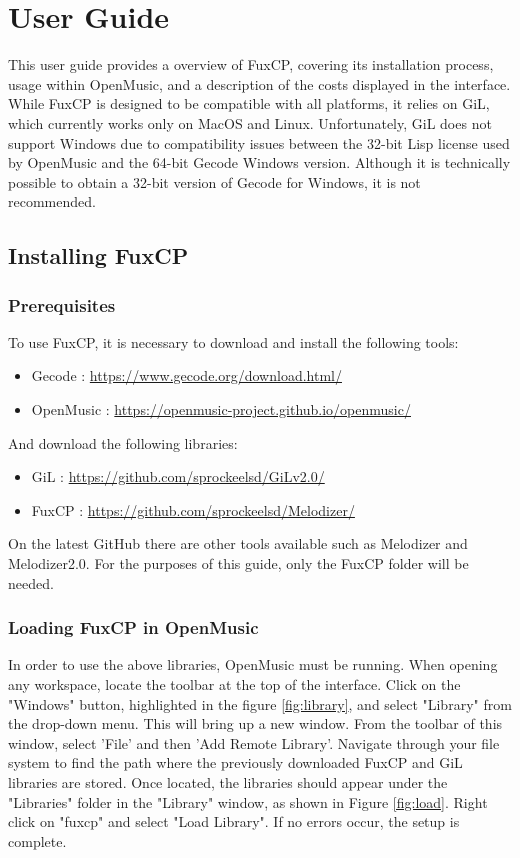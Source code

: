 \chapter{User Guide}
This user guide provides a overview of FuxCP, covering its installation process, usage within OpenMusic, and a description of the costs displayed in the interface. While FuxCP is designed to be compatible with all platforms, it relies on GiL, which currently works only on MacOS and Linux. Unfortunately, GiL does not support Windows due to compatibility issues between the 32-bit Lisp license used by OpenMusic and the 64-bit Gecode Windows version. Although it is technically possible to obtain a 32-bit version of Gecode for Windows, it is not recommended. 

\section{Installing FuxCP}
\subsection{Prerequisites}
To use FuxCP, it is necessary to download and install the following tools:
\begin{itemize}
    \item Gecode : \url{https://www.gecode.org/download.html/}
    \item OpenMusic : \url{https://openmusic-project.github.io/openmusic/}
\end{itemize}

And download the following libraries:
\begin{itemize}
    \item GiL : \url{https://github.com/sprockeelsd/GiLv2.0/}
    \item FuxCP : \url{https://github.com/sprockeelsd/Melodizer/}
\end{itemize}
On the latest GitHub there are other tools available such as Melodizer and Melodizer2.0. For the purposes of this guide, only the FuxCP folder will be needed.

\subsection{Loading FuxCP in OpenMusic}
In order to use the above libraries, OpenMusic must be running. When opening any workspace, locate the toolbar at the top of the interface. Click on the "Windows" button, highlighted in the figure \ref{fig:library}, and select "Library" from the drop-down menu. This will bring up a new window. From the toolbar of this window, select 'File' and then 'Add Remote Library'. Navigate through your file system to find the path where the previously downloaded FuxCP and GiL libraries are stored. Once located, the libraries should appear under the "Libraries" folder in the "Library" window, as shown in Figure \ref{fig:load}. Right click on "fuxcp" and select "Load Library". If no errors occur, the setup is complete.

